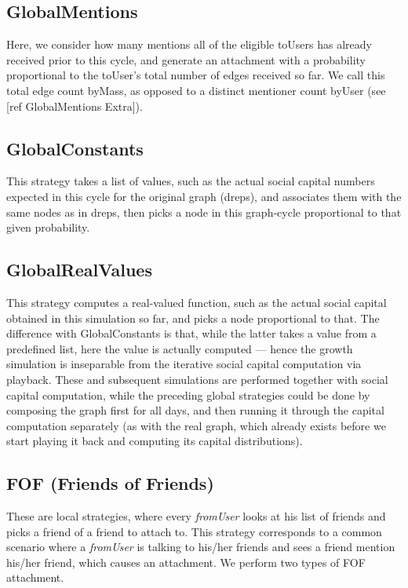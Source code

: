 \documentclass[10pt,oneside]{memoir}
\begin{document}
\subsection{GlobalMentions}
\label{globalmentions}

Here, we consider how many mentions all of the eligible toUsers has already received prior to this cycle, and generate an attachment with a probability proportional to the toUser's total number of edges received so far. We call this total edge count byMass, as opposed to a distinct mentioner count byUser (see [ref GlobalMentions Extra]).


\subsection{GlobalConstants}
\label{globalconstants}

This strategy takes a list of values, such as the actual social capital numbers expected in this cycle for the original graph (dreps), and associates them with the same nodes as in dreps, then picks a node in this graph-cycle proportional to that given probability.


\subsection{GlobalRealValues}
\label{globalrealvalues}

This strategy computes a real-valued function, such as the actual social capital obtained in this simulation so far, and picks a node proportional to that.  The difference with GlobalConstants is that, while the latter takes a value from a predefined list, here the value is actually computed --- hence the growth simulation is inseparable from the iterative social capital computation via playback.  These and subsequent simulations are performed together with social capital computation, while the preceding global strategies could be done by composing the graph first for all days, and then running it through the capital computation separately (as with the real graph, which already exists before we start playing it back and computing its capital distributions).


\subsection{FOF (Friends of Friends)}
\label{foffriendsoffriends}

These are local strategies, where every \emph{fromUser} looks at his list of friends and picks a friend of a friend to attach to.  This strategy corresponds to a common scenario where a \emph{fromUser} is talking to his/her friends and sees a friend mention his/her friend, which causes an attachment.  We perform two types of FOF attachment.
\end{document}
